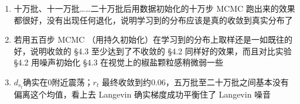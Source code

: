 \documentclass[11pt]{article}
\begin{document}
\begin{enumerate}
\begin{enumerate}
\item 十万批、十一万批……二十万批后用数据初始化的十万步 MCMC 跑出来的效果都很好，没有出现任何退化，说明学习到的分布应该是真的收敛到真实分布了
\item 若用五百步 MCMC （用持久初始化）在学习到的分布上取样还是一如既往的好，说明收敛的 \S4.3 至少达到了不收敛的 \S4.2 同样好的效果，而且对比实验 \S4.2 用噪声初始化 \S4.3 在视觉上的椒盐颗粒感稍微弱一些
\item $d_{s_t}$确实在0附近震荡；$r_t$ 最终收敛到约$0.06$，五万批至二十万批之间基本没有偏离这个均值，看上去 Langevin 确实梯度成功平衡住了 Langevin 噪音
\end{enumerate}
\end{enumerate}

\renewcommand\refname{参考文献}


\end{document}
